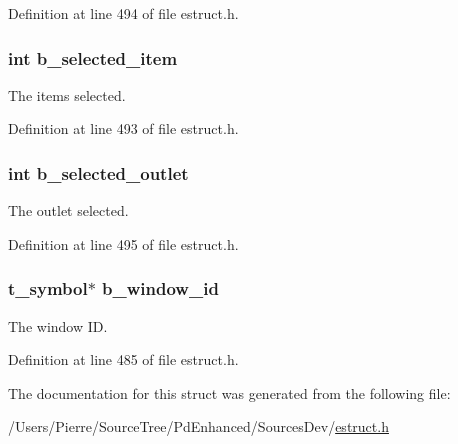 Definition at line 494 of file estruct.\-h.

\hypertarget{struct__edspbox_a1f65b6d093e53fd85bed085ce0c5dd8e}{
\subsubsection[{b\-\_\-selected\-\_\-item}]{\setlength{\rightskip}{0pt plus 5cm}int b\-\_\-selected\-\_\-item}}\label{struct__edspbox_a1f65b6d093e53fd85bed085ce0c5dd8e}
The items selected. 

Definition at line 493 of file estruct.\-h.

\hypertarget{struct__edspbox_acbf0482cb9c6e192e2059775acc1ac86}{
\subsubsection[{b\-\_\-selected\-\_\-outlet}]{\setlength{\rightskip}{0pt plus 5cm}int b\-\_\-selected\-\_\-outlet}}\label{struct__edspbox_acbf0482cb9c6e192e2059775acc1ac86}
The outlet selected. 

Definition at line 495 of file estruct.\-h.

\hypertarget{struct__edspbox_a7033df943e798c68e3a6117785c2d79e}{
\subsubsection[{b\-\_\-window\-\_\-id}]{\setlength{\rightskip}{0pt plus 5cm}t\-\_\-symbol$\ast$ b\-\_\-window\-\_\-id}}\label{struct__edspbox_a7033df943e798c68e3a6117785c2d79e}
The window I\-D. 

Definition at line 485 of file estruct.\-h.



The documentation for this struct was generated from the following file\-:\begin{DoxyCompactItemize}
\item 
/\-Users/\-Pierre/\-Source\-Tree/\-Pd\-Enhanced/\-Sources\-Dev/\hyperlink{estruct_8h}{estruct.\-h}\end{DoxyCompactItemize}
